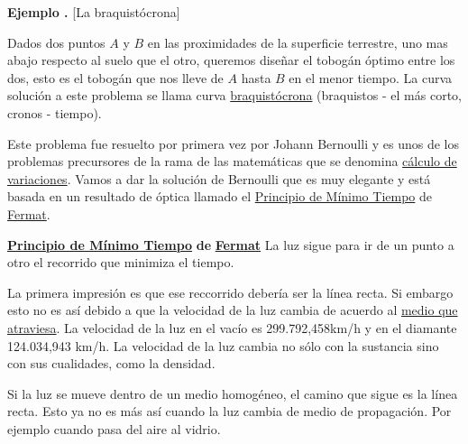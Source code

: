 \documentclass{article}
\newcounter{ejemplo_cont}
\newenvironment{ejemplo}{\noindent\textbf{Ejemplo  \arabic{ejemplo_cont}.} }{\addtocounter{ejemplo_cont}{1}}
\begin{document}
\begin{ejemplo}[La braquistócrona]

\end{ejemplo}


\begin{problema} Dados dos puntos $A$ y $B$ en las proximidades de la superficie terrestre, uno mas abajo respecto al suelo que el otro,
queremos diseñar el tobogán óptimo entre los dos,
esto es el tobogán que nos lleve de $A$ hasta $B$ en el menor tiempo. La curva solución a este problema se llama curva 
\href{http://es.wikipedia.org/wiki/Curva_braquistócrona}{braquistócrona} (braquistos - el más corto, cronos - tiempo). 
\end{problema}


\begin{center}
\end{center}


 Este problema fue resuelto por primera vez por Johann Bernoulli y es unos de los problemas precursores de la rama de las matemáticas que se denomina
\href{http://es.wikipedia.org/wiki/Cálculo_variacional}{cálculo de 
variaciones}. Vamos a dar la solución de Bernoulli que es muy elegante y está basada en un resultado de óptica llamado 
 el \href{http://es.wikipedia.org/wiki/Principio_de_Fermat}{Principio de Mínimo Tiempo} de \href{http://es.wikipedia.org/wiki/Fermat}{Fermat}.

\begin{boite}[boxcolor=orange, background=blue!5, titlebackground=blue!20,
titleboxcolor = black]{\href{http://es.wikipedia.org/wiki/Principio_de_Fermat}{\textbf {Principio de Mínimo Tiempo}} \textbf{de} \href{http://es.wikipedia.org/wiki/Fermat}{\textbf{Fermat}}}
 La luz sigue para ir de un punto a otro el recorrido que minimiza el tiempo.
\end{boite}



 La primera impresión   es que ese reccorrido debería ser la línea recta. Si embargo esto no es así debido a que la velocidad de la luz cambia
de acuerdo al \href{http://es.wikipedia.org/wiki/Velocidad_de_la_luz_en_un_medio_material}{medio que atraviesa}. 
La velocidad de la luz en el vacío es 299.792,458km/h y en el diamante 124.034,943 km/h. La velocidad de la luz cambia no sólo con la sustancia sino con sus cualidades, 
como la densidad. 

 Si la luz se mueve dentro de un medio homogéneo, el camino que sigue es la línea recta. Esto ya no es más así cuando la luz cambia de medio de propagación. Por ejemplo
cuando pasa del aire al vidrio. 
\end{document}
